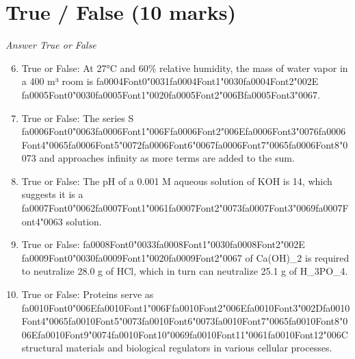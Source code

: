 \documentclass[12pt]{article}
\begin{document}
\section*{True / False (10 marks)}
\textit{Answer True or False}
\begin{enumerate}[label=\arabic*.]
\setcounter{enumi}{5}
\item True or False: At 27°C and 60\% relative humidity, the mass of water vapor in a 400 m³ room is {\csname fa0004Font0\endcsname\char"0031}{\csname fa0004Font1\endcsname\char"0030}{\csname fa0004Font2\endcsname\char"002E} {\csname fa0005Font0\endcsname\char"0030}{\csname fa0005Font1\endcsname\char"0020}{\csname fa0005Font2\endcsname\char"006B}{\csname fa0005Font3\endcsname\char"0067}.
\item True or False: The series S {\csname fa0006Font0\endcsname\char"0063}{\csname fa0006Font1\endcsname\char"006F}{\csname fa0006Font2\endcsname\char"006E}{\csname fa0006Font3\endcsname\char"0076}{\csname fa0006Font4\endcsname\char"0065}{\csname fa0006Font5\endcsname\char"0072}{\csname fa0006Font6\endcsname\char"0067}{\csname fa0006Font7\endcsname\char"0065}{\csname fa0006Font8\endcsname\char"0073} and approaches infinity as more terms are added to the sum.
\item True or False: The pH of a 0.001 M aqueous solution of KOH is 14, which suggests it is a {\csname fa0007Font0\endcsname\char"0062}{\csname fa0007Font1\endcsname\char"0061}{\csname fa0007Font2\endcsname\char"0073}{\csname fa0007Font3\endcsname\char"0069}{\csname fa0007Font4\endcsname\char"0063} solution.
\item True or False: {\csname fa0008Font0\endcsname\char"0033}{\csname fa0008Font1\endcsname\char"0030}{\csname fa0008Font2\endcsname\char"002E} {\csname fa0009Font0\endcsname\char"0030}{\csname fa0009Font1\endcsname\char"0020}{\csname fa0009Font2\endcsname\char"0067} of Ca(OH)\_2 is required to neutralize 28.0 g of HCl, which in turn can neutralize 25.1 g of H\_3PO\_4.
\item True or False: Proteins serve as {\csname fa0010Font0\endcsname\char"006E}{\csname fa0010Font1\endcsname\char"006F}{\csname fa0010Font2\endcsname\char"006E}{\csname fa0010Font3\endcsname\char"002D}{\csname fa0010Font4\endcsname\char"0065}{\csname fa0010Font5\endcsname\char"0073}{\csname fa0010Font6\endcsname\char"0073}{\csname fa0010Font7\endcsname\char"0065}{\csname fa0010Font8\endcsname\char"006E}{\csname fa0010Font9\endcsname\char"0074}{\csname fa0010Font10\endcsname\char"0069}{\csname fa0010Font11\endcsname\char"0061}{\csname fa0010Font12\endcsname\char"006C} structural materials and biological regulators in various cellular processes.
\end{enumerate}
\end{document}

